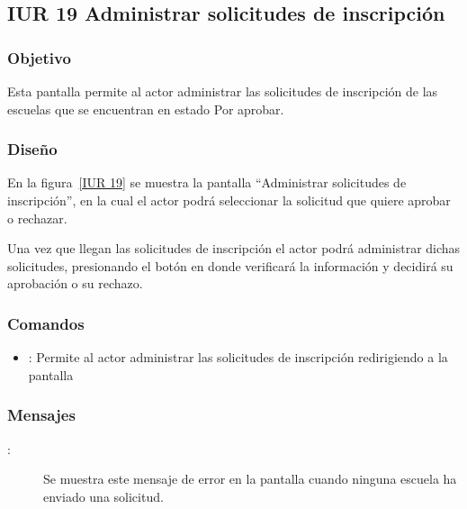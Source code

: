 \subsection{IUR 19 Administrar solicitudes de inscripción}

\subsubsection{Objetivo}

    Esta pantalla permite al actor  administrar las solicitudes de inscripción de las escuelas que se encuentran en estado Por aprobar.

\subsubsection{Diseño}

    En la figura~\ref{IUR 19} se muestra la pantalla ``Administrar solicitudes de inscripción'', en la cual el actor  podrá seleccionar la solicitud que quiere aprobar o rechazar.
    

	Una vez que llegan las solicitudes de inscripción el actor podrá administrar dichas solicitudes, presionando el botón \botOk en donde verificará la información y decidirá su aprobación o su rechazo.
	
\subsubsection{Comandos}
    \begin{itemize}
    \item \botOk [Aprobar]: Permite al actor administrar las solicitudes de inscripción redirigiendo a la pantalla 
    \end{itemize}

\subsubsection{Mensajes}
\begin{description}
	\item[:] Se muestra este mensaje de error en la pantalla  cuando ninguna escuela ha enviado una solicitud.
\end{description}